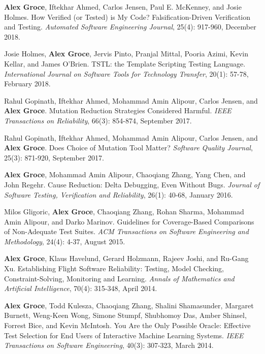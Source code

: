 \documentclass[ComputerScience]{vita}
\begin{document}
\begin{vita}
\begin{Refereed Journal Publications}
\item
{\bf Alex Groce}, Iftekhar Ahmed, Carlos Jensen, Paul E. McKenney, and
Josie Holmes.
\newblock How Verified (or Tested) is My Code? Falsification-Driven Verification and Testing.
\newblock \emph{Automated Software Engineering Journal}, 25(4):
917-960, December 2018.

\item
Josie Holmes, {\bf Alex Groce}, Jervis Pinto, Pranjal Mittal, Pooria Azimi, Kevin Kellar, and James O'Brien.
\newblock TSTL: the Template Scripting Testing Language.
\newblock \emph{International Journal on Software Tools for Technology
  Transfer}, 20(1): 57-78, February 2018.


\item
Rahul Gopinath, Iftekhar Ahmed, Mohammad Amin Alipour, Carlos Jensen, and {\bf Alex Groce}.
\newblock Mutation Reduction Strategies Considered Harmful.
\newblock \emph{IEEE Transactions on Reliability}, 66(3): 854-874, September 2017.


\item
Rahul Gopinath, Iftekhar Ahmed, Mohammad Amin Alipour, Carlos Jensen, and {\bf Alex Groce}.
\newblock Does Choice of Mutation Tool Matter?
\newblock \emph{Software Quality Journal}, 25(3): 871-920, September 2017.

\item
{\bf Alex Groce}, Mohammad Amin Alipour, Chaoqiang Zhang, Yang Chen, and John Regehr.
\newblock Cause Reduction: Delta Debugging, Even Without Bugs.
\newblock \emph{Journal of Software Testing, Verification and
  Reliability}, 26(1): 40-68, January 2016.

\item
Milos Gligoric, {\bf Alex Groce}, Chaoqiang Zhang, Rohan Sharma, Mohammad Amin Alipour, and Darko Marinov.
\newblock Guidelines for Coverage-Based Comparisons of Non-Adequate Test Suites.
\newblock \emph{ACM Transactions on Software Engineering and Methodology}, 24(4): 4-37, August 2015.

\item
{\bf Alex Groce}, Klaus Havelund, Gerard Holzmann, Rajeev Joshi, and Ru-Gang Xu.
\newblock Establishing Flight Software Reliability: Testing, Model Checking, Constraint-Solving, Monitoring and Learning.
\newblock \emph{Annals of Mathematics and Artificial Intelligence}, 70(4): 315-348, April 2014.

\item
{\bf Alex Groce}, Todd Kulesza, Chaoqiang Zhang, Shalini Shamasunder, Margaret Burnett, Weng-Keen Wong, Simone Stumpf, Shubhomoy Das, Amber Shinsel, Forrest Bice, and Kevin McIntosh.
\newblock You Are the Only Possible Oracle: Effective Test Selection for End Users of Interactive Machine Learning Systems.
\newblock \emph{IEEE Transactions on Software Engineering}, 40(3): 307-323, March 2014.


\end{Refereed Journal Publications}
\end{vita}
\end{document}
